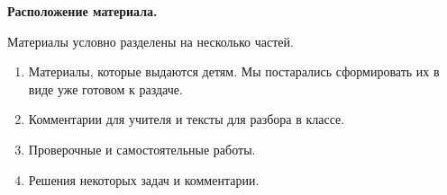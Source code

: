 \begin{center}
	\textbf{Расположение материала.}
\end{center}
Материалы условно разделены на несколько частей.
\begin{enumerate}
	\item Материалы, которые выдаются детям. Мы постарались сформировать их в виде уже готовом к раздаче.
	\item Комментарии для учителя и тексты для разбора в классе.
	\item Проверочные и самостоятельные работы.
	\item Решения некоторых задач и комментарии.
\end{enumerate}
